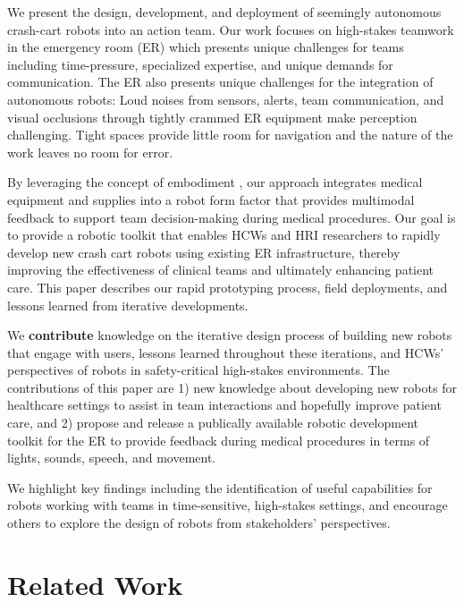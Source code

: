 We present the design, development, and deployment of seemingly autonomous crash-cart robots into an action team. 
Our work focuses on high-stakes teamwork in the emergency room (ER) which presents unique challenges for teams including time-pressure, specialized expertise, and unique demands for communication. 
The ER also presents unique challenges for the integration of autonomous robots: Loud noises from sensors, alerts, team communication, and visual occlusions through tightly crammed ER equipment make perception challenging. 
Tight spaces provide little room for navigation and the nature of the work leaves no room for error.

By leveraging the concept of embodiment \cite{massaro1990psychology}, our approach integrates medical equipment and supplies into a robot form factor that provides multimodal feedback to support team decision-making during medical procedures. 
Our goal is to provide a robotic toolkit that enables HCWs and HRI researchers to rapidly develop new crash cart robots using existing ER infrastructure, thereby improving the effectiveness of clinical teams and ultimately enhancing patient care. 
This paper describes our rapid prototyping process, field deployments, and lessons learned from iterative developments. 

We \textbf{contribute} knowledge on the iterative design process of building new robots that engage with users, lessons learned throughout these iterations, and HCWs' perspectives of robots in safety-critical high-stakes environments.
The contributions of this paper are 1) new knowledge about developing new robots for healthcare settings to assist in team interactions and hopefully improve patient care, and
2) propose and release a publically available robotic development toolkit for the ER to provide feedback during medical procedures in terms of lights, sounds, speech, and movement.

We highlight key findings%
including the identification of useful capabilities for robots working with teams in time-sensitive, high-stakes settings, and encourage others to explore the design of robots from stakeholders' perspectives.%


\section{Related Work}

